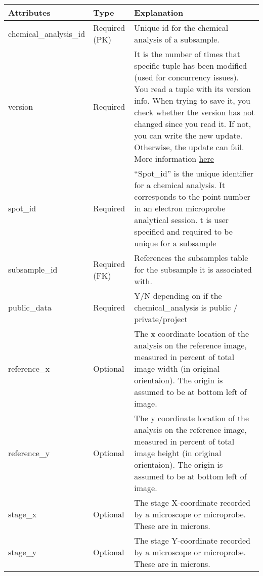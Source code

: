 \documentclass[letterpaper,10pt,english]{sphinxmanual}
\begin{document}
\begin{tabulary}{\linewidth}{|L|L|L|}
\hline
\textbf{
Attributes
} & \textbf{
Type
} & \textbf{
Explanation
}\\\hline

chemical\_analysis\_id
 & 
Required (PK)
 & 
Unique id for the chemical analysis of a subsample.
\\\hline

version
 & 
Required
 & 
It is the number of times that specific tuple has been modified
(used for concurrency issues). You read a tuple with its version info.
When trying to save it, you check whether the version has not changed
since you read it. If not, you can write the new update. Otherwise,
the update can fail. More information \href{http://wiki.cs.rpi.edu/trac/metpetdb/wiki/Versioning}{here}
\\\hline

spot\_id
 & 
Required
 & 
``Spot\_id'' is the unique identifier for a chemical analysis.
It corresponds to the point number in an electron microprobe
analytical session. t is user specified and required to be unique
for a subsample
\\\hline

subsample\_id
 & 
Required (FK)
 & 
References the subsamples table for the subsample it is
associated with.
\\\hline

public\_data
 & 
Required
 & 
Y/N depending on if the chemical\_analysis is
public / private/project
\\\hline

reference\_x
 & 
Optional
 & 
The x coordinate location of the analysis on the reference image,
measured in percent of total image width (in original orientaion).
The origin is assumed to be at bottom left of image.
\\\hline

reference\_y
 & 
Optional
 & 
The y coordinate location of the analysis on the reference image,
measured in percent of total image height (in original orientaion).
The origin is assumed to be at bottom left of image.
\\\hline

stage\_x
 & 
Optional
 & 
The stage X-coordinate recorded by a microscope or microprobe.
These are in microns.
\\\hline

stage\_y
 & 
Optional
 & 
The stage Y-coordinate recorded by a microscope or microprobe.
These are in microns.
\\\hline


\end{tabulary}
\end{document}
